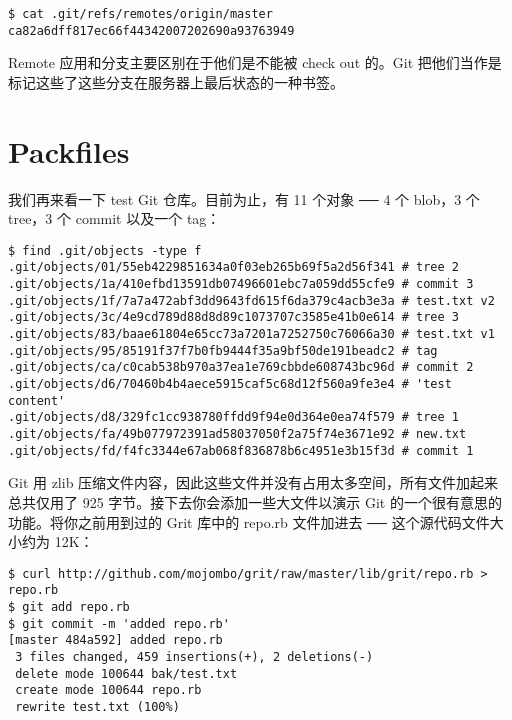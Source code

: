 \documentclass[a4paper]{book}
\begin{document}
\begin{shaded}\begin{verbatim}
$ cat .git/refs/remotes/origin/master
ca82a6dff817ec66f44342007202690a93763949
\end{verbatim}\end{shaded}

Remote 应用和分支主要区别在于他们是不能被 check out 的。Git 把他们当作是标记这些了这些分支在服务器上最后状态的一种书签。

\section{Packfiles}

我们再来看一下 test Git 仓库。目前为止，有 11 个对象 ── 4 个 blob，3 个 tree，3 个 commit 以及一个 tag：

\begin{shaded}\begin{verbatim}
$ find .git/objects -type f
.git/objects/01/55eb4229851634a0f03eb265b69f5a2d56f341 # tree 2
.git/objects/1a/410efbd13591db07496601ebc7a059dd55cfe9 # commit 3
.git/objects/1f/7a7a472abf3dd9643fd615f6da379c4acb3e3a # test.txt v2
.git/objects/3c/4e9cd789d88d8d89c1073707c3585e41b0e614 # tree 3
.git/objects/83/baae61804e65cc73a7201a7252750c76066a30 # test.txt v1
.git/objects/95/85191f37f7b0fb9444f35a9bf50de191beadc2 # tag
.git/objects/ca/c0cab538b970a37ea1e769cbbde608743bc96d # commit 2
.git/objects/d6/70460b4b4aece5915caf5c68d12f560a9fe3e4 # 'test content'
.git/objects/d8/329fc1cc938780ffdd9f94e0d364e0ea74f579 # tree 1
.git/objects/fa/49b077972391ad58037050f2a75f74e3671e92 # new.txt
.git/objects/fd/f4fc3344e67ab068f836878b6c4951e3b15f3d # commit 1
\end{verbatim}\end{shaded}

Git 用 zlib 压缩文件内容，因此这些文件并没有占用太多空间，所有文件加起来总共仅用了 925 字节。接下去你会添加一些大文件以演示 Git 的一个很有意思的功能。将你之前用到过的 Grit 库中的 repo.rb 文件加进去 ── 这个源代码文件大小约为 12K：

\begin{shaded}\begin{verbatim}
$ curl http://github.com/mojombo/grit/raw/master/lib/grit/repo.rb > repo.rb
$ git add repo.rb
$ git commit -m 'added repo.rb'
[master 484a592] added repo.rb
 3 files changed, 459 insertions(+), 2 deletions(-)
 delete mode 100644 bak/test.txt
 create mode 100644 repo.rb
 rewrite test.txt (100%)
\end{verbatim}\end{shaded}
\end{document}
